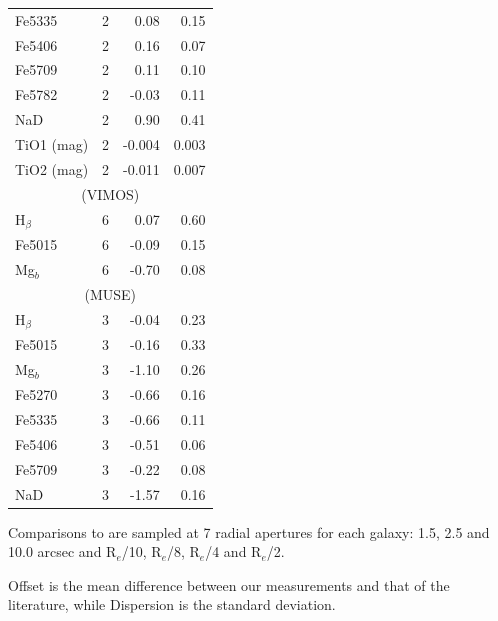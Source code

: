\begin{table}
\begin{threeparttable}
\begin{tabular*}{0.8\textwidth}{@{\extracolsep{\fill}}l r r r}
			Fe5335 		& 2 		& 0.08\leavevmode\phantom{0}& 0.15\leavevmode\phantom{0}	\\
			Fe5406 		& 2 		& 0.16\leavevmode\phantom{0}& 0.07\leavevmode\phantom{0}	\\
			Fe5709 		& 2 		& 0.11\leavevmode\phantom{0}& 0.10\leavevmode\phantom{0}	\\
			Fe5782 		& 2 		& -0.03\leavevmode\phantom{0}& 0.11\leavevmode\phantom{0}	\\
			NaD 		& 2 		& 0.90\leavevmode\phantom{0}& 0.41\leavevmode\phantom{0}	\\
			TiO1 (mag)	& 2 		& -0.004	& 0.003	\\
			TiO2 (mag)	& 2 		& -0.011	& 0.007	\\
			\hline
			\multicolumn{4}{c}{\citet{Ogando2008} (VIMOS)} \\
			\hline
			H$_\beta$ 	& 6 		& 0.07\leavevmode\phantom{0}& 0.60\leavevmode\phantom{0}	\\
			Fe5015 		& 6 		& -0.09\leavevmode\phantom{0}& 0.15\leavevmode\phantom{0}	\\
			Mg$_b$ 		& 6 		& -0.70\leavevmode\phantom{0}& 0.08\leavevmode\phantom{0}	\\
			\hline
			\multicolumn{4}{c}{\citet{Ogando2008} (MUSE)} \\
			\hline
			H$_\beta$ 	& 3 		& -0.04\leavevmode\phantom{0}& 0.23\leavevmode\phantom{0}	\\ 
			Fe5015 		& 3 		& -0.16\leavevmode\phantom{0}& 0.33\leavevmode\phantom{0}	\\ 
			Mg$_b$ 		& 3 		& -1.10\leavevmode\phantom{0}& 0.26\leavevmode\phantom{0}	\\
			Fe5270 		& 3 		& -0.66\leavevmode\phantom{0}& 0.16\leavevmode\phantom{0}	\\
			Fe5335 		& 3 		& -0.66\leavevmode\phantom{0}& 0.11\leavevmode\phantom{0}	\\
			Fe5406 		& 3 		& -0.51\leavevmode\phantom{0}& 0.06\leavevmode\phantom{0}	\\
			Fe5709 		& 3 		& -0.22\leavevmode\phantom{0}& 0.08\leavevmode\phantom{0}	\\
			NaD 		& 3 		& -1.57\leavevmode\phantom{0}& 0.16\leavevmode\phantom{0}	\\
			\hline
			\hline
		\end{tabular*}
		\begin{tablenotes}
		\footnotesize
		\item Comparisons to \citet{Rampazzo2005} are sampled at 7 radial apertures for each galaxy: 1.5, 2.5 and 10.0 arcsec and R$_e$/10, R$_e$/8, R$_e$/4 and R$_e$/2. 
		\item Offset is the mean difference between our measurements and that of the literature, while Dispersion is the standard deviation.
		\end{tablenotes}
	\end{threeparttable}
	\end{table}


